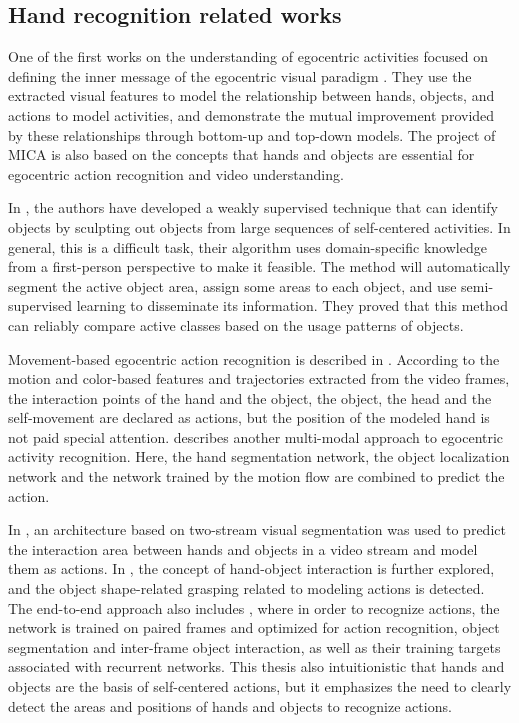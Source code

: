 \subsection{Hand recognition related works}
One of the first works on the understanding of egocentric activities focused on defining the inner message of the egocentric visual paradigm \cite{10.1109/ICCV.2011.6126269}. They use the extracted visual features to model the relationship between hands, objects, and actions to model activities, and demonstrate the mutual improvement provided by these relationships through bottom-up and top-down models. The project of MICA is also based on the concepts that hands and objects are essential for egocentric action recognition and video understanding.

In \cite{5995444}, the authors have developed a weakly supervised technique that can identify objects by sculpting out objects from large sequences of self-centered activities. In general, this is a difficult task, their algorithm uses domain-specific knowledge from a first-person perspective to make it feasible. The method will automatically segment the active object area, assign some areas to each object, and use semi-supervised learning to disseminate its information. They proved that this method can reliably compare active classes based on the usage patterns of objects.

Movement-based egocentric action recognition is described in \cite{7298625}. According to the motion and color-based features and trajectories extracted from the video frames, the interaction points of the hand and the object, the object, the head and the self-movement are declared as actions, but the position of the modeled hand is not paid special attention. \cite{7780578} describes another multi-modal approach to egocentric activity recognition. Here, the hand segmentation network, the object localization network and the network trained by the motion flow are combined to predict the action.

In \cite{DBLP:journals/corr/BertasiusPYS16}, an architecture based on two-stream visual segmentation was used to predict the interaction area between hands and objects in a video stream and model them as actions. In \cite{cai2016understanding}, the concept of hand-object interaction is further explored, and the object shape-related grasping related to modeling actions is detected. The end-to-end approach also includes \cite{DBLP:journals/corr/abs-1806-06157}, where in order to recognize actions, the network is trained on paired frames and optimized for action recognition, object segmentation and inter-frame object interaction, as well as their training targets associated with recurrent networks. This thesis also intuitionistic that hands and objects are the basis of self-centered actions, but it emphasizes the need to clearly detect the areas and positions of hands and objects to recognize actions.

